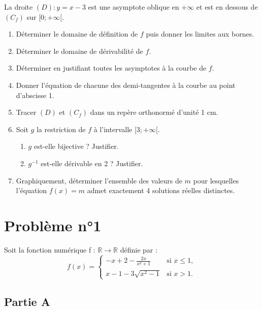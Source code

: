 \documentclass[12pt]{article}
\begin{document}
La droite $(D) : y = x - 3$ est une asymptote oblique en $+\infty$ et est en dessous de $(C_f)$ sur $[0; +\infty[$.


\begin{enumerate}
    \item Déterminer le domaine de définition de $f$ puis donner les limites aux bornes.
    \item Déterminer le domaine de dérivabilité de $f$.
    \item Déterminer en justifiant toutes les asymptotes à la courbe de $f$.
    \item Donner l'équation de chacune des demi-tangentes à la courbe au point d'abscisse 1.
    \item Tracer $(D)$ et $(C_f)$ dans un repère orthonormé d'unité 1 cm.
    \item Soit $g$ la restriction de $f$ à l'intervalle $[3; +\infty[$.
    \begin{enumerate}
        \item $g$ est-elle bijective ? Justifier.
        \item $g^{-1}$ est-elle dérivable en 2 ? Justifier.
    \end{enumerate}
    \item Graphiquement, déterminer l'ensemble des valeurs de $m$ pour lesquelles l'équation $f(x) = m$ admet exactement 4 solutions réelles distinctes.
\end{enumerate}

\section*{Problème n°1}

Soit la fonction numérique  f : $\mathbb{R} \to \mathbb{R}$  définie par :
\[
f(x) =
\begin{cases}
-x + 2 - \frac{2x}{x^2 + 1} & \text{si } x \leq 1, \\
x - 1 - 3\sqrt{x^2 - 1} & \text{si } x > 1.
\end{cases}
\]

\subsection*{Partie A}
\end{document}
